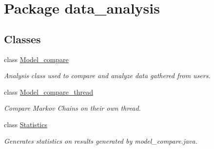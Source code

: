 \hypertarget{namespacedata__analysis}{}\section{Package data\+\_\+analysis}
\label{namespacedata__analysis}
\subsection*{Classes}
\begin{DoxyCompactItemize}
\item 
class \hyperlink{classdata__analysis_1_1_model__compare}{Model\+\_\+compare}
\begin{DoxyCompactList}\small\item\em Analysis class used to compare and analyze data gathered from users. \end{DoxyCompactList}\item 
class \hyperlink{classdata__analysis_1_1_model__compare__thread}{Model\+\_\+compare\+\_\+thread}
\begin{DoxyCompactList}\small\item\em Compare Markov Chains on their own thread. \end{DoxyCompactList}\item 
class \hyperlink{classdata__analysis_1_1_statistics}{Statistics}
\begin{DoxyCompactList}\small\item\em Generates statistics on results generated by model\+\_\+compare.\+java. \end{DoxyCompactList}\end{DoxyCompactItemize}
